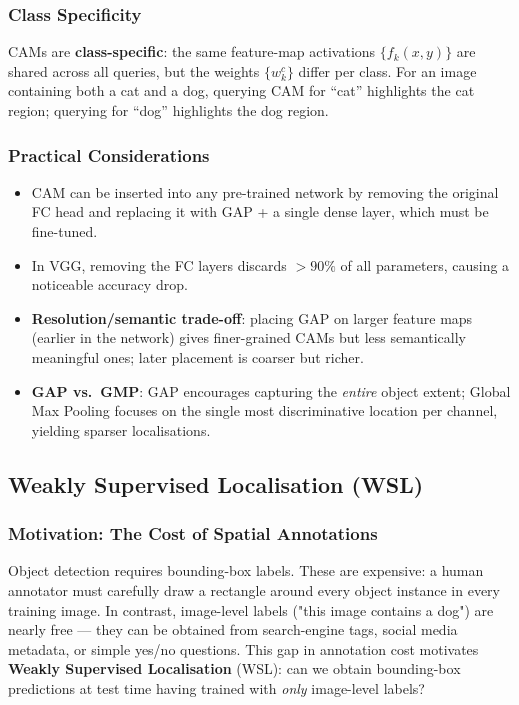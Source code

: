 \documentclass[11pt,a4paper]{article}
\newcommand{\term}[1]{\textcolor{DefGreen}{\textbf{#1}}}
\begin{document}
\subsubsection{Class Specificity}

CAMs are \term{class-specific}: the same feature-map activations $\{f_k(x,y)\}$ are shared across all queries, but the weights $\{w_k^c\}$ differ per class. For an image containing both a cat and a dog, querying CAM for ``cat'' highlights the cat region; querying for ``dog'' highlights the dog region.

\subsubsection{Practical Considerations}

\begin{itemize}
  \item CAM can be inserted into any pre-trained network by removing the original FC head and replacing it with GAP + a single dense layer, which must be fine-tuned.
  \item In VGG, removing the FC layers discards $>90\%$ of all parameters, causing a noticeable accuracy drop.
  \item \textbf{Resolution/semantic trade-off}: placing GAP on larger feature maps (earlier in the network) gives finer-grained CAMs but less semantically meaningful ones; later placement is coarser but richer.
  \item \textbf{GAP vs.\ GMP}: GAP encourages capturing the \emph{entire} object extent; Global Max Pooling focuses on the single most discriminative location per channel, yielding sparser localisations.
\end{itemize}

\subsection{Weakly Supervised Localisation (WSL)}
\label{sec:wsl}

\subsubsection{Motivation: The Cost of Spatial Annotations}

Object detection requires bounding-box labels. These are expensive: a human annotator must carefully draw a rectangle around every object instance in every training image. In contrast, image-level labels ("this image contains a dog") are nearly free — they can be obtained from search-engine tags, social media metadata, or simple yes/no questions. This gap in annotation cost motivates \term{Weakly Supervised Localisation} (WSL): can we obtain bounding-box predictions at test time having trained with \emph{only} image-level labels?
\end{document}
